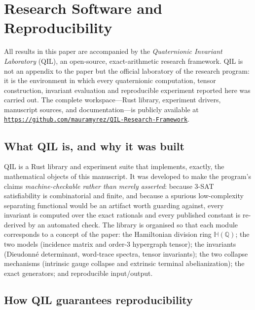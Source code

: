 \documentclass[pdflatex,sn-mathphys-num]{sn-jnl}
\theoremstyle{thmstyleone}%
\theoremstyle{thmstyletwo}%
\theoremstyle{thmstylethree}%
\newcommand{\HH}{\mathbb{H}}
\newcommand{\QQ}{\mathbb{Q}}
\newcommand{\QILRepositoryURL}{https://github.com/mauramyrez/QIL-Research-Framework}
\begin{document}
\newpage

\section{Research Software and Reproducibility}\label{sec:software}

All results in this paper are accompanied by the \emph{Quaternionic
Invariant Laboratory} (QIL), an open-source, exact-arithmetic research
framework. QIL is not an appendix to the paper but the official laboratory of
the research program: it is the environment in which every quaternionic
computation, tensor construction, invariant evaluation and reproducible
experiment reported here was carried out. The complete workspace---Rust
library, experiment drivers, manuscript sources, and documentation---is
publicly available at
\href{\QILRepositoryURL}{\nolinkurl{\QILRepositoryURL}}.

\subsection{What QIL is, and why it was built}

QIL is a Rust library and experiment suite that implements, exactly, the
mathematical objects of this manuscript. It was developed to make the
program's claims \emph{machine-checkable rather than merely asserted}: because
$3$-SAT satisfiability is combinatorial and finite, and because a spurious
low-complexity separating functional would be an artifact worth guarding
against, every invariant is computed over the exact rationals and every
published constant is re-derived by an automated check. The library is
organised so that each module corresponds to a concept of the paper: the
Hamiltonian division ring $\HH(\QQ)$; the two models (incidence matrix and
order-3 hypergraph tensor); the invariants (Dieudonn\'e determinant,
word-trace spectra, tensor invariants); the two collapse mechanisms
(intrinsic gauge collapse and extrinsic terminal abelianization); the exact
generators; and reproducible input/output.

\subsection{How QIL guarantees reproducibility}
\end{document}
